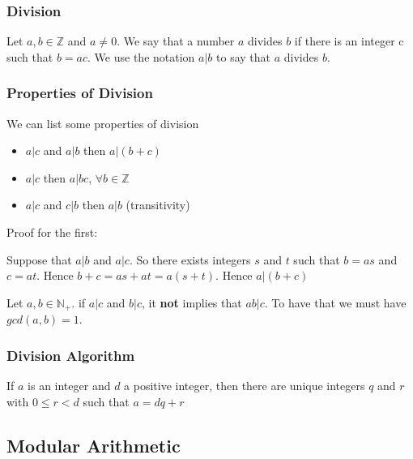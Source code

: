 \documentclass{article}
\begin{document}
\subsubsection{Division} Let $ a,b \in \mathbb{Z} $ and $ a \neq 0 $. We say that a number $ a $ divides $ b $ if there is an integer c such that $ b = ac $. We use the notation $ a | b $ to say that $ a $ divides $ b $.

\subsubsection{Properties of Division} We can list some properties of division
\begin{itemize}
\item $ a | c $ and $ a | b $ then $ a | (b+c) $
\item $ a | c $ then $ a | bc $, $ \forall b \in \mathbb{Z} $
\item $ a | c $ and $ c | b $ then $ a | b $ (transitivity)
\end{itemize}
Proof for the first:

\begin{tcolorbox}[width=12.1cm]
Suppose that $ a|b $ and $ a|c $. So there exists integers $ s $ and $ t $ such that $ b = as $ and $ c = at $. Hence $ b + c = as + at = a(s+t) $. Hence $ a|(b+c) $
\end{tcolorbox}

\begin{tcolorbox}[width=12.1cm, leftrule=3mm]
Let $ a,b \in \mathbb{N_+} $. if $ a|c $ and $ b|c $, it \textbf{not} implies that $ ab|c $. To have that we must have $ gcd(a,b) = 1 $.
\end{tcolorbox}

\subsubsection{Division Algorithm}
\begin{tcolorbox}[sharp corners, colback=green!30, colframe=green!80!blue, title=Division Algorithm]
If $ a $ is an integer and $ d $ a positive integer, then there are unique integers $ q $ and $ r $ with $ 0 \leq r < d $ such that $ a = dq + r $
\end{tcolorbox}

\subsection{Modular Arithmetic}
\end{document}
